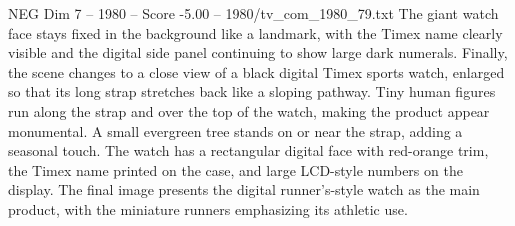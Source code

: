 \begin{textsample}{NEG Dim 7 – 1980 – Score -5.00 – 1980/tv\_com\_1980\_79.txt}
The giant watch face stays fixed in the background like a landmark, with the Timex name clearly visible and the digital side panel continuing to show large dark numerals.
Finally, the scene changes to a close view of a black digital Timex sports watch, enlarged so that its long strap stretches back like a sloping pathway.
Tiny human figures run along the strap and over the top of the watch, making the product appear monumental.
A small evergreen tree stands on or near the strap, adding a seasonal touch.
The watch has a rectangular digital face with red-orange trim, the Timex name printed on the case, and large LCD-style numbers on the display.
The final image presents the digital runner’s-style watch as the main product, with the miniature runners emphasizing its athletic use.

\end{textsample}
